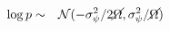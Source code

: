 \begin{eqnarray}
  \log {p} & \sim & \mathcal{N}(-\sigma_{\psi}^{2}/2 \cancel{\Omega},\sigma_{\psi}^{2}/\cancel{\Omega})
\end{eqnarray}
